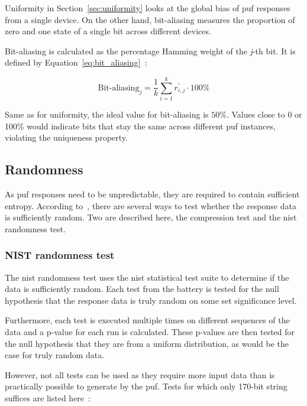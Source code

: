 Uniformity in Section~\ref{sec:uniformity} looks at the global bias of \gls{puf} responses from a single device. On the other hand, bit-aliasing measures the proportion of zero and one state of a single bit across different devices.

Bit-aliasing is calculated as the percentage Hamming weight of the \emph{j}-th bit. It is defined by Equation~\ref{eq:bit_aliasing}~\cite{Maiti2011}:

\begin{equation}\label{eq:bit_aliasing}
    \textrm{Bit-aliasing}_{j} = \frac{1}{k}\sum_{i=1}^{k}r_{i, j}^{'} \cdot 100\%
\end{equation}

Same as for uniformity, the ideal value for bit-aliasing is $50\%$. Values close to 0 or 100\% would indicate bits that stay the same across different \gls{puf} instances, violating the uniqueness property.

\subsection{Randomness}

As \gls{puf} responses need to be unpredictable, they are required to contain sufficient entropy. According to~\cite{Leest2010}, there are several ways to test whether the response data is sufficiently random. Two are described here, the compression test and the \acrshort{nist} randomness test.

\subsubsection*{NIST randomness test}

The \acrshort{nist} randomness test uses the \acrshort{nist} statistical test suite to determine if the data is sufficiently random. Each test from the battery is tested for the null hypothesis that the response data is truly random on some set significance level.

Furthermore, each test is executed multiple times on different sequences of the data and a p-value for each run is calculated. These p-values are then tested for the null hypothesis that they are from a uniform distribution, as would be the case for truly random data.~\cite{NIST2010}

However, not all tests can be used as they require more input data than is practically possible to generate by the \gls{puf}. Tests for which only 170-bit string suffices are listed here~\cite{Leest2010}:

